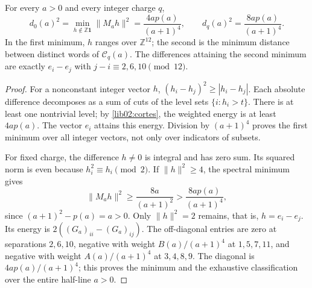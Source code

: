 \begin{theorem}
\label{lib02:distancias}
For every \(a>0\) and every integer charge \(q\),
\begin{equation}
 d_0(a)^2=\min_{h\notin\mathbb Z\mathbf1}\|M_ah\|^2
 =\frac{4ap(a)}{(a+1)^4},\qquad
 d_q(a)^2=\frac{8ap(a)}{(a+1)^4}.
 \label{lib02:distancias-exactas}
\end{equation}
In the first minimum, \(h\) ranges over \(\mathbb Z^{12}\); the second is the minimum distance between distinct words of \(\mathcal C_q(a)\). The differences attaining the second minimum are exactly \(e_i-e_j\) with \(j-i\equiv2,6,10\pmod{12}\).
\end{theorem}
\begin{proof}
For a nonconstant integer vector \(h\), \((h_i-h_j)^2\geq|h_i-h_j|\). Each absolute difference decomposes as a sum of cuts of the level sets \(\{i:h_i>t\}\). There is at least one nontrivial level; by \cref{lib02:cortes}, the weighted energy is at least \(4ap(a)\). The vector \(e_i\) attains this energy. Division by \((a+1)^4\) proves the first minimum over all integer vectors, not only over indicators of subsets.

For fixed charge, the difference \(h\ne0\) is integral and has zero sum. Its squared norm is even because \(h_i^2\equiv h_i\pmod2\). If \(\|h\|^2\geq4\), the spectral minimum gives
\[
 \|M_ah\|^2\geq\frac{8a}{(a+1)^2}
 >\frac{8ap(a)}{(a+1)^4},
\]
since \((a+1)^2-p(a)=a>0\). Only \(\|h\|^2=2\) remains, that is, \(h=e_i-e_j\). Its energy is \(2((G_a)_{ii}-(G_a)_{ij})\). The off-diagonal entries are zero at separations \(2,6,10\), negative with weight \(B(a)/(a+1)^4\) at \(1,5,7,11\), and negative with weight \(A(a)/(a+1)^4\) at \(3,4,8,9\). The diagonal is \(4ap(a)/(a+1)^4\); this proves the minimum and the exhaustive classification over the entire half-line \(a>0\).
\end{proof}

